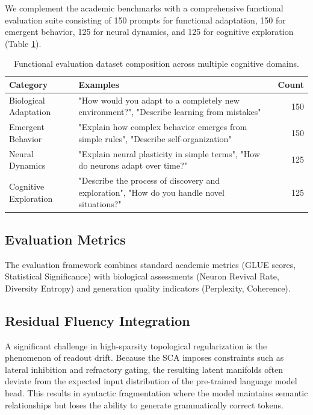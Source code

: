 \documentclass[11pt, letterpaper]{article}
\begin{document}
We complement the academic benchmarks with a comprehensive functional evaluation suite consisting of 150 prompts for functional adaptation, 150 for emergent behavior, 125 for neural dynamics, and 125 for cognitive exploration (Table \ref{tab:biological_dataset}).

\begin{table}[htbp]
    \centering
    \caption{Functional evaluation dataset composition across multiple cognitive domains.}
    \label{tab:biological_dataset}
    \begin{tabular}{@{} p{3.5cm} p{7.5cm} r @{}}
        \toprule
        \textbf{Category} & \textbf{Examples} & \textbf{Count} \\
        \midrule
        Biological Adaptation & "How would you adapt to a completely new environment?", "Describe learning from mistakes" & 150 \\
        Emergent Behavior     & "Explain how complex behavior emerges from simple rules", "Describe self-organization" & 150 \\
        Neural Dynamics       & "Explain neural plasticity in simple terms", "How do neurons adapt over time?" & 125 \\
        Cognitive Exploration & "Describe the process of discovery and exploration", "How do you handle novel situations?" & 125 \\
        \bottomrule
    \end{tabular}
\end{table}

\subsection{Evaluation Metrics}
The evaluation framework combines standard academic metrics (GLUE scores, 
Statistical Significance) with biological assessments (Neuron Revival Rate, 
Diversity Entropy) and generation quality indicators (Perplexity, Coherence).

\subsection{Residual Fluency Integration}
A significant challenge in high-sparsity topological regularization is the phenomenon of readout drift. Because the SCA imposes constraints such as lateral inhibition and refractory gating, the resulting latent manifolds often deviate from the expected input distribution of the pre-trained language model head. This results in syntactic fragmentation where the model maintains semantic relationships but loses the ability to generate grammatically correct tokens.
\end{document}
